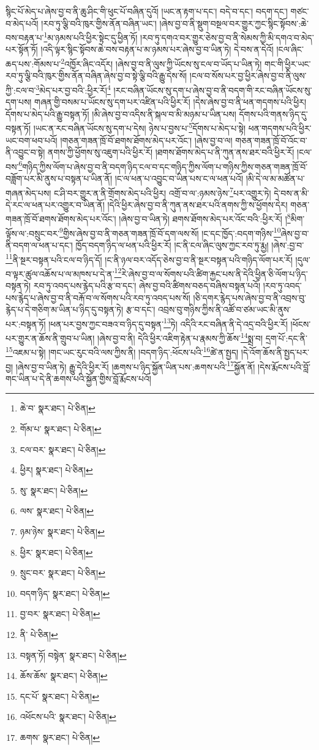 སྙིང་པོ་མེད་པ་ཞེས་བྱ་བ་ནི་ཆུ་ཤིང་གི་ཕུང་པོ་བཞིན་དུའོ། །ཡང་ན་རྟག་པ་དང་། བདེ་བ་དང་། བདག་དང་། གཙང་བ་མེད་པའོ། །རབ་ཏུ་ལྕི་བའི་ཁུར་གྱིས་ནོན་བཞིན་ཡང་། །ཞེས་བྱ་བ་ནི་སྡུག་བསྔལ་བར་གྱུར་ཀྱང་སྙིང་སྟོབས་:ཆེ་བས་བརྟན་པ་\footnote{ཆེ་བ་  སྣར་ཐང་།  པེ་ཅིན། }མ་ཉམས་པའི་ཕྱིར་སྟེང་དུ་ཕྱིན་ཏོ། །རབ་ཏུ་དགའ་བར་གྱུར་ཅེས་བྱ་བ་ནི་སེམས་ཀྱི་མི་དགའ་བ་མེད་པར་སྟོན་ཏོ། །འདི་ལྟར་སྙིང་སྟོབས་ཆེ་བས་བརྟན་པ་མ་ཉམས་པར་ཞེས་བྱ་བ་ཡིན་ཏེ། དེ་བས་ན་དེའོ། །ངལ་ཞིང་ཆད་པས་:གོམས་པ་\footnote{གོམ་པ་  སྣར་ཐང་།  པེ་ཅིན། }འཁྱོར་ཞིང་འདོར། །ཞེས་བྱ་བ་ནི་ལུས་ཀྱི་ཡོངས་སུ་ངལ་བ་ཡོད་པ་ཡིན་ཏེ། གང་གི་ཕྱིར་ཡང་རབ་ཏུ་ལྕི་བའི་ཁུར་གྱིས་ནོན་བཞིན་ཞེས་བྱ་བ་སྟེ་ལྕི་བའི་རྒྱུ་དེས་སོ། །ངལ་བ་སོས་པར་བྱ་ཕྱིར་ཞེས་བྱ་བ་ནི་ལུས་ཀྱི་:ངལ་བ་\footnote{ངལ་བར་  སྣར་ཐང་།  པེ་ཅིན། }མེད་པར་བྱ་བའི་:ཕྱིར་རོ།\footnote{ཕྱིར།  སྣར་ཐང་།  པེ་ཅིན། } །རང་བཞིན་ཡོངས་སུ་དག་པ་ཞེས་བྱ་བ་ནི་བདག་གི་རང་བཞིན་ཡོངས་སུ་དག་པས། གཞན་གྱི་བསམ་པ་ཡོངས་སུ་དག་པར་འཛིན་པའི་ཕྱིར་རོ། །དེས་ཞེས་བྱ་བ་ནི་ཕན་གདགས་པའི་ཕྱིར། དོགས་པ་མེད་པའི་རྒྱུ་བསྟན་ཏོ། །མི་ཞེས་བྱ་བ་འདིས་ནི་སྐལ་བ་མི་མཉམ་པ་ཡིན་པས། དོགས་པའི་གནས་ཉིད་དུ་བསྟན་ཏོ། །ཡང་ན་རང་བཞིན་ཡོངས་སུ་དག་པ་དེས། ཉེས་པ་བྱས་པ་\footnote{སུ་  སྣར་ཐང་།  པེ་ཅིན། }དོགས་པ་མེད་པ་སྟེ། ཕན་གདགས་པའི་ཕྱིར་ཡང་བག་ཕབ་པའོ། །གཅན་གཟན་ཁྲོ་བོ་ཐགས་ཐོགས་མེད་པར་འོང་། །ཞེས་བྱ་བ་ལ། གཅན་གཟན་ཁྲོ་བོ་འོང་བ་ནི་འབྱུང་བ་སྟེ། ནགས་ཀྱི་ཕྱོགས་སུ་འཇུག་པའི་ཕྱིར་རོ། །ཐགས་ཐོགས་མེད་པ་ནི་ཀུན་ནས་ཐར་བའི་ཕྱིར་རོ། །ངལ་བས་\footnote{ལས་  སྣར་ཐང་།  པེ་ཅིན། }གཉིད་ཀྱིས་ལོག་པ་ཞེས་བྱ་བ་ནི་བདག་ཉིད་ངལ་བ་དང་གཉིད་ཀྱིས་ལོག་པ་གཉིས་ཀྱིས་གཅན་གཟན་ཁྲོ་བོ་བཟློག་པར་མི་ནུས་པ་བསྟན་པ་ཡིན་ནོ། །ང་ལ་ཕན་པ་འབྱུང་བ་ཡིན་པས་ང་ལ་ཕན་པའོ། །མི་དེ་ལ་མ་མཚོན་པ་གཞན་མེད་པས། ང་ཤི་བར་གྱུར་ན་ནི་གྲོགས་མེད་པའི་ཕྱིར། འགྲོ་བ་ལ་:ཉམས་ཉེས་\footnote{ཉམ་ཉེས་  སྣར་ཐང་།  པེ་ཅིན། }པར་འགྱུར་ཏེ། དེ་བས་ན་མི་དེ་རང་ལ་ཕན་པར་འགྱུར་བ་ཡིན་ནོ། །དེའི་ཕྱིར་ཞེས་བྱ་བ་ནི་ཀུན་ནས་ཐར་པའི་ནགས་ཀྱི་ས་ཕྱོགས་དེར། གཅན་གཟན་ཁྲོ་བོ་ཐགས་ཐོགས་མེད་པར་འོང་། །ཞེས་བྱ་བ་ཡིན་ཏེ། ཐགས་ཐོགས་མེད་པར་འོང་བའི་:ཕྱིར་རོ། །\footnote{ཕྱིར་  སྣར་ཐང་།  པེ་ཅིན། }མིག་ལྟོས་ལ་:བསྲུང་བར་\footnote{སྲུང་བར་  སྣར་ཐང་།  པེ་ཅིན། }གྱིས་ཞེས་བྱ་བ་ནི་གཅན་གཟན་ཁྲོ་བོ་དག་ལས་སོ། །ང་དང་ཁྱོད་:བདག་གཉིས་\footnote{བདག་ཉིད་  སྣར་ཐང་།  པེ་ཅིན། }ཞེས་བྱ་བ་ནི་བདག་ལ་ཕན་པ་དང་། ཁྱོད་བདག་ཉིད་ལ་ཕན་པའི་ཕྱིར་རོ། །ང་ནི་ངལ་ཞིང་ལུས་ཀྱང་རབ་ཏུ་རྨྱ། །ཞེས་:བྱ་བ་\footnote{བྱ་བར་  སྣར་ཐང་།  པེ་ཅིན། }ནི་སྔར་བསྟན་པའི་ངལ་བ་ཉིད་དོ། །ང་ནི་ཉལ་བར་འདོད་ཅེས་བྱ་བ་ནི་སྔར་བསྟན་པའི་གཉིད་ལོག་པར་རོ། །དུལ་བ་ལྟར་ཚུལ་འཆོས་པ་ལ་མཁས་པ་དེ་ན་\footnote{ནི་  པེ་ཅིན། }རེ་ཞེས་བྱ་བ་ལ་སོགས་པའི་ཚིག་རྐྱང་པས་ནི་དེའི་ཕྱིན་ཅི་ལོག་པ་ཉིད་བསྟན་ཏེ། རབ་ཏུ་འབད་པས་རྙེད་པའི་རྩ་བ་དང་། ཞེས་བྱ་བའི་ཚིགས་བཅད་བཞིས་བསྟན་པའོ། །རབ་ཏུ་འབད་པས་རྙེད་པ་ཞེས་བྱ་བ་ནི་བརྐོ་བ་ལ་སོགས་པའི་རབ་ཏུ་འབད་པས་སོ། །ཅི་དགར་རྙེད་པས་ཞེས་བྱ་བ་ནི་འབྲས་བུ་རྙེད་པ་དེ་གཅིག་མ་ཡིན་པ་ཉིད་དུ་བསྟན་ཏེ། རྩ་བ་དང་། འབྲས་བུ་གཉིས་ཀྱིས་ནི་འཚོ་བ་ཙམ་ཡང་མི་ནུས་པར་:བསྟན་ཏོ། །ཕན་པར་བྱས་ཀྱང་བཟའ་བ་ཉིད་དུ་བསྟན་\footnote{བསྟན་ཏོ། བསྟེན་  སྣར་ཐང་།  པེ་ཅིན། }ཏེ། འདིའི་རང་བཞིན་ནི་དེ་འདྲ་བའི་ཕྱིར་རོ། །ཕོངས་པར་གྱུར་ན་ཆོས་ནི་གྲུབ་པ་ཡིན། །ཞེས་བྱ་བ་ནི། དེའི་ཕྱིར་འཇིག་རྟེན་པ་རྣམས་ཀྱི་ཆོས་\footnote{ཆོས་ཆོས་  སྣར་ཐང་།  པེ་ཅིན། }སྨྲ་བ། དྲག་པོ་:དང་ནི་\footnote{དང་པོ་  སྣར་ཐང་།  པེ་ཅིན། }འཇམ་པ་སྟེ། །གང་ཡང་རུང་བའི་ལས་ཀྱིས་ནི། །བདག་ཉིད་:ཕོངས་པའི་\footnote{འཕོངས་པའི་  སྣར་ཐང་།  པེ་ཅིན། }ཚེ་ན་སྤྱད། །དེ་འོག་ཆོས་ནི་སྤྱད་པར་བྱ། །ཞེས་བྱ་བ་ཡིན་ཏེ། རྒྱུ་དེའི་ཕྱིར་རོ། །ཆགས་པ་ཉིད་སྐྱོན་ཡིན་པས་:ཆགས་པའི་\footnote{ཆགས་  སྣར་ཐང་།  པེ་ཅིན། }སྐྱོན་ནོ། །དེས་རྨོངས་པའི་བློ་གང་ཡིན་པ་དེ་ནི་ཆགས་པའི་སྐྱོན་གྱིས་བློ་རྨོངས་པའོ། 